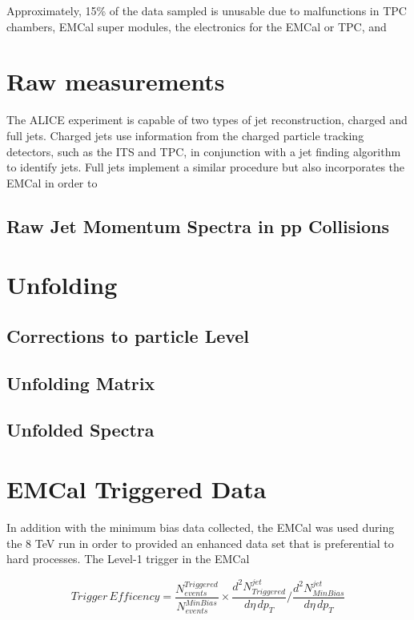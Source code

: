 Approximately, 15\% of the data sampled is unusable due to malfunctions in TPC chambers, EMCal super modules, the electronics for the EMCal or TPC, and   
\section{Raw measurements}
The ALICE experiment is capable of two types of jet reconstruction, charged and full jets.  Charged jets use information from the charged particle tracking detectors, such as the ITS and TPC, in conjunction with a jet finding algorithm to identify jets.  Full jets implement a similar procedure but also incorporates the EMCal in order to 

\subsection{Raw Jet Momentum Spectra in pp Collisions}




\section{Unfolding}

\subsection{Corrections to particle Level}

\subsection{Unfolding Matrix}

\subsection{Unfolded Spectra}

\section{EMCal Triggered Data}

In addition with the minimum bias data collected, the EMCal was used during the 8 TeV run in order to provided an enhanced data set that is preferential to hard processes.   The Level-1 trigger\cite{Bourrion:2010js} in the EMCal 

\begin{equation}
	Trigger \, Efficency = \frac{N^{Triggered}_{events}}{N^{MinBias}_{events}} \times \frac{d^{2} N_{Triggered}^{jet}}{d\eta \, dp_{T}} \Bigg/  \frac{d^{2} N_{MinBias}^{jet}}{d\eta \, dp_{T}} 
\label{eq:xsecdef}
\end{equation}

